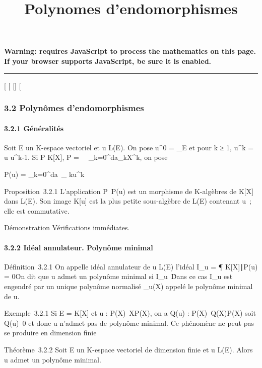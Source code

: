 \documentclass[]{article}
\title{Polynomes d'endomorphismes}
\author{}
\date{}
\begin{document}
\maketitle

\textbf{Warning: 
requires JavaScript to process the mathematics on this page.\\ If your
browser supports JavaScript, be sure it is enabled.}

\begin{center}\rule{3in}{0.4pt}\end{center}

{[}
{[}
{[}{]}
{[}

\subsubsection{3.2 Polynômes d'endomorphismes}

\paragraph{3.2.1 Généralités}

Soit E un K-espace vectoriel et u \in L(E). On pose u^0 =
\mathrmId\_E et pour k ≥ 1, u^k = u
\cdot u^k-1. Si P \in K{[}X{]}, P =\
\sum ~
\_k=0^da\_kX^k, on pose

P(u) = \sum \_k=0^da~\_
ku^k

Proposition~3.2.1 L'application P\mapsto~P(u) est un
morphisme de K-algèbres de K{[}X{]} dans L(E). Son image K{[}u{]} est la
plus petite sous-algèbre de L(E) contenant u~; elle est commutative.

Démonstration Vérifications immédiates.

\paragraph{3.2.2 Idéal annulateur. Polynôme minimal}

Définition~3.2.1 On appelle idéal annulateur de u \in L(E) l'idéal
I\_u = \P \in
K{[}X{]}∣P(u) = 0\. On dit
que u admet un polynôme minimal si
I\_u\neq~\0\.
Dans ce cas I\_u est engendré par un unique polynôme normalisé
\mu\_u(X) appelé le polynôme minimal de u.

Exemple~3.2.1 Si E = K{[}X{]} et u :
P(X)\mapsto~XP(X), on a Q(u) :
P(X)\mapsto~Q(X)P(X) soit
Q(u)\neq~0 et donc u n'admet pas de polynôme
minimal. Ce phénomène ne peut pas se produire en dimension finie

Théorème~3.2.2 Soit E un K-espace vectoriel de dimension finie et u \in
L(E). Alors u admet un polynôme minimal.
\end{document}
